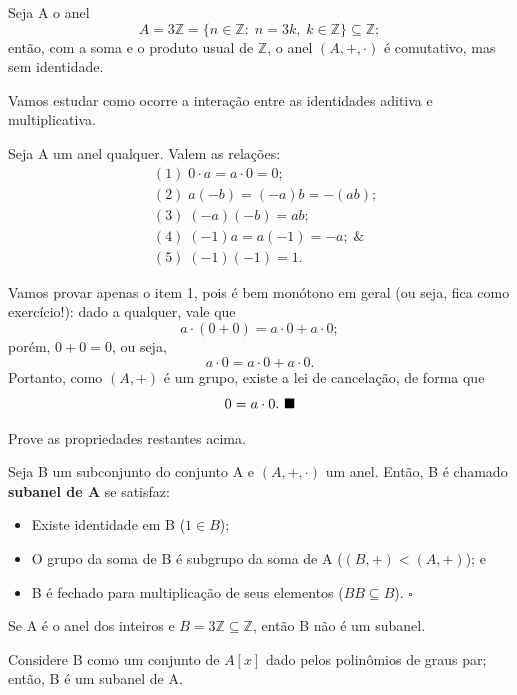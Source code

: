 \documentclass[../algebraIII_notes.tex]{subfiles}
\begin{document}
\begin{example}
	Seja A o anel
	\[
		A = 3 \mathbb{Z} = \{n\in \mathbb{Z}:\; n = 3k,\; k\in \mathbb{Z}\}\subseteq \mathbb{Z};
	\]
	então, com a soma e o produto usual de \(\mathbb{Z}\), o anel \((A, +, \cdot )\) é comutativo, mas sem identidade.
\end{example}
Vamos estudar como ocorre a interação entre as identidades aditiva e multiplicativa.
\begin{lemma*}
	Seja A um anel qualquer. Valem as relações:
	\begin{align*}
		 & (1)\; 0 \cdot a = a \cdot 0 = 0; \\
		 & (2)\; a(-b) = (-a)b = -(ab);     \\
		 & (3)\; (-a)(-b) = ab;             \\
		 & (4)\; (-1)a = a(-1) = -a; \;\&   \\
		 & (5)\; (-1)(-1)=1.
	\end{align*}
\end{lemma*}
\begin{proof*}
	Vamos provar apenas o item 1, pois é bem monótono em geral (ou seja, fica como exercício!): dado a qualquer, vale que
	\[
		a \cdot  (0+0) = a \cdot 0 + a \cdot 0;
	\]
	porém, \(0+0 = 0\), ou seja,
	\[
		a \cdot 0 = a \cdot 0 + a \cdot 0.
	\]
	Portanto, como \((A, +)\) é um grupo, existe a lei de cancelação, de forma que
	\[
		0 = a \cdot 0. \text{ $\blacksquare$}
	\]
\end{proof*}
\begin{exr}
	Prove as propriedades restantes acima.
\end{exr}
\begin{def*}
	Seja B um subconjunto do conjunto A e \((A, +, \cdot )\) um anel. Então, B é chamado \textbf{subanel de A} se satisfaz:
	\begin{itemize}
		\item[1)] Existe identidade em B (\(1\in B\));
		\item[2)] O grupo da soma de B é subgrupo da soma de A (\((B, +)< (A, +)\)); e
		\item[3)] B é fechado para multiplicação de seus elementos (\(BB\subseteq B\)). \(\square\)
	\end{itemize}
\end{def*}
\begin{example}
	Se A é o anel dos inteiros e \(B = 3\mathbb{Z}\subseteq \mathbb{Z}\), então B não é um subanel.
\end{example}
\begin{example}[Subanel]
	Considere B como um conjunto de \(A[x]\) dado pelos polinômios de graus par; então, B é um subanel de A.
\end{example}
\end{document}
